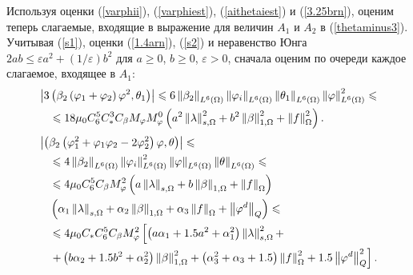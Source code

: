 Используя оценки (\ref{varphii}), (\ref{varphiest}), (\ref{aithetaiest}) и (\ref{3.25brn}), оценим теперь слагаемые, входящие в выражение для величин $A_1$ и $A_2$ в (\ref{thetaminus3}). Учитывая (\ref{s1}),  оценки (\ref{1.4arn}), (\ref{s2}) и неравенство Юнга $2 ab \le \varepsilon a^2 + (1/ \varepsilon) b^2$ для $a \ge 0$, $b \ge 0$, $\varepsilon >0$, сначала оценим по очереди каждое слагаемое, входящее в $A_1$:
\begin{equation}
	\label{3.16arn}
	\begin{split}
		&\left\vert 3 
			\left( 
				\beta_2 \left( \varphi_1 + \varphi_2 \right) 
				\varphi^2, \theta_1
			 \right)
		 \right\vert 
		\leqslant 
			6 \left\Vert \beta_2 \right\Vert_{L^6 (\Omega)} 
			\left\Vert \varphi_i \right\Vert_{L^6 (\Omega)} 
			\left\Vert \theta_1 \right\Vert_{L^6 (\Omega)}  
			\left\Vert \varphi \right\Vert_{L^6 (\Omega)}^2 
		\leqslant \\
		&\quad\leqslant 
			18 \mu_0 
			C_6^5 C_{*} ^3 C_\beta 
			M_\varphi M_\varphi^0    
			\left(  
				a^2 \left\Vert \lambda \right\Vert_{s,\Omega}^2 
				+ b^2 \left\Vert \beta \right\Vert_{1,\Omega}^2 
				+ \left\Vert f \right\Vert_\Omega^2 
			 \right).
	\end{split}
\end{equation}
\begin{equation}
	\label{3.17arn}
	\begin{split}
		&\left\vert  
			\left( 
				\beta_2 \left( \varphi_1^2 + \varphi_1 \varphi_2 - 2 \varphi_2^2 \right) 
				\varphi, \theta
			 \right)
		 \right\vert 
		\leqslant \\
		&\quad\leqslant 
			4 \left\Vert \beta_2 \right\Vert_{L^6(\Omega)} 
			\left\Vert \varphi_i \right\Vert_{L^6 (\Omega)}^2 
			\left\Vert \varphi \right\Vert_{L^6 (\Omega)} 
			\left\Vert \theta \right\Vert_{L^6 (\Omega)} 
		\leqslant \\
		&\quad\leqslant 
			4 \mu_0 
			C_6^5 C_\beta 
			M_\varphi^2 
			\left(  
				a \left\Vert \lambda \right\Vert_{s,\Omega}
				+ b \left\Vert \beta \right\Vert_{1,\Omega} 
				+ \left\Vert f \right\Vert_\Omega 
			 \right) \\
			&\quad \left( 
				\alpha_1 \left\Vert \lambda \right\Vert_{s,\Omega} 
				+ \alpha_2 \left\Vert \beta \right\Vert_{1,\Omega} 
				+ \alpha_3 \left\Vert f \right\Vert_\Omega 
				+ \left\Vert \varphi^d \right\Vert_Q
			 \right)
		\leqslant \\
		&\quad\leqslant 
			4 \mu_0 
			C_{*} C_6^5 C_\beta 
			M_\varphi^2
			\left[ 
				\left( 
					a \alpha_1 
					+ 1.5 a^2 
					+ \alpha_1^2
				 \right) \left\Vert \lambda \right\Vert_{s,\Omega}^2 + \right. \\
				&\quad\left. + \left( 
					b \alpha_2 
					+ 1.5 b^2 
					+ \alpha_2^2
				 \right) \left\Vert \beta \right\Vert_{1,\Omega}^2
		 		+ \left( 
		 			\alpha_3^2
		 			+ \alpha_3 
		 			+ 1.5
		 		 \right) \left\Vert f \right\Vert_\Omega^2
		 		+ 1.5 \left\Vert \varphi^d \right\Vert_Q^2
			 \right].
	\end{split}
\end{equation}
